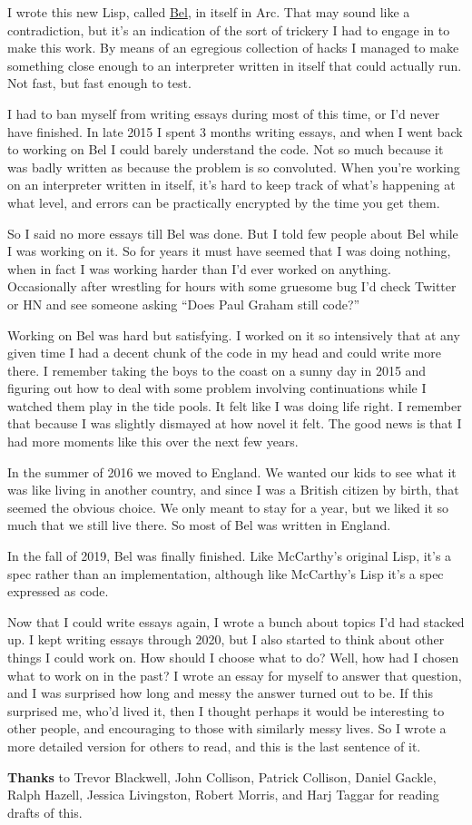 I wrote this new Lisp, called \href{bel.html}{Bel}, in itself in Arc.
That may sound like a contradiction, but it's an indication of the sort
of trickery I had to engage in to make this work. By means of an
egregious collection of hacks I managed to make something close enough
to an interpreter written in itself that could actually run. Not fast,
but fast enough to test.

I had to ban myself from writing essays during most of this time, or I'd
never have finished. In late 2015 I spent 3 months writing essays, and
when I went back to working on Bel I could barely understand the code.
Not so much because it was badly written as because the problem is so
convoluted. When you're working on an interpreter written in itself,
it's hard to keep track of what's happening at what level, and errors
can be practically encrypted by the time you get them.

So I said no more essays till Bel was done. But I told few people about
Bel while I was working on it. So for years it must have seemed that I
was doing nothing, when in fact I was working harder than I'd ever
worked on anything. Occasionally after wrestling for hours with some
gruesome bug I'd check Twitter or HN and see someone asking ``Does Paul
Graham still code?''

Working on Bel was hard but satisfying. I worked on it so intensively
that at any given time I had a decent chunk of the code in my head and
could write more there. I remember taking the boys to the coast on a
sunny day in 2015 and figuring out how to deal with some problem
involving continuations while I watched them play in the tide pools. It
felt like I was doing life right. I remember that because I was slightly
dismayed at how novel it felt. The good news is that I had more moments
like this over the next few years.

In the summer of 2016 we moved to England. We wanted our kids to see
what it was like living in another country, and since I was a British
citizen by birth, that seemed the obvious choice. We only meant to stay
for a year, but we liked it so much that we still live there. So most of
Bel was written in England.

In the fall of 2019, Bel was finally finished. Like McCarthy's original
Lisp, it's a spec rather than an implementation, although like
McCarthy's Lisp it's a spec expressed as code.

Now that I could write essays again, I wrote a bunch about topics I'd
had stacked up. I kept writing essays through 2020, but I also started
to think about other things I could work on. How should I choose what to
do? Well, how had I chosen what to work on in the past? I wrote an essay
for myself to answer that question, and I was surprised how long and
messy the answer turned out to be. If this surprised me, who'd lived it,
then I thought perhaps it would be interesting to other people, and
encouraging to those with similarly messy lives. So I wrote a more
detailed version for others to read, and this is the last sentence of
it.


\textbf{Thanks} to Trevor Blackwell, John Collison, Patrick Collison,
Daniel Gackle, Ralph Hazell, Jessica Livingston, Robert Morris, and Harj
Taggar for reading drafts of this.